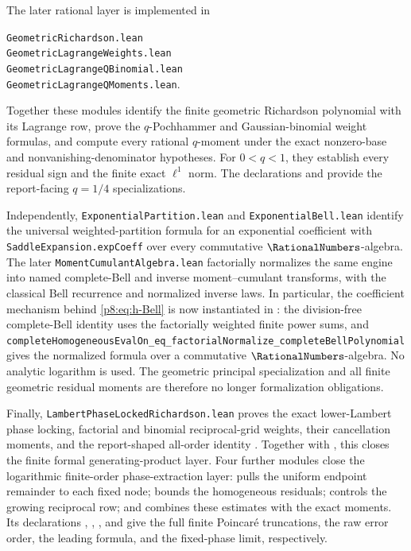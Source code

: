 \documentclass[11pt]{article}
\numberwithin{equation}{section}
\theoremstyle{definition}
\theoremstyle{remark}
\begin{document}
The later rational layer is implemented in
\begin{center}
\texttt{GeometricRichardson.lean}\\
\texttt{GeometricLagrangeWeights.lean}\\
\texttt{GeometricLagrangeQBinomial.lean}\\
\texttt{GeometricLagrangeQMoments.lean}.
\end{center}
Together these modules identify the finite geometric Richardson polynomial
with its Lagrange row, prove the \(q\)-Pochhammer and Gaussian-binomial weight
formulas, and compute every rational \(q\)-moment
under the exact nonzero-base and nonvanishing-denominator hypotheses.  For
\(0<q<1\), they establish every residual sign and the finite exact
\(\ell^1\) norm.  The declarations
 and
 provide
the report-facing \(q=1/4\) specializations.

Independently,
\texttt{ExponentialPartition.lean} and
\texttt{ExponentialBell.lean} identify the universal weighted-partition
formula for an exponential coefficient with
\texttt{SaddleExpansion.expCoeff} over every commutative
\(\RationalNumbers\)-algebra.  The later \texttt{MomentCumulantAlgebra.lean}
factorially normalizes the same engine into named complete-Bell and inverse
moment--cumulant transforms, with the classical Bell recurrence and
normalized inverse laws.  In particular, the coefficient mechanism behind
\eqref{p8:eq:h-Bell} is now instantiated in
: the division-free complete-Bell identity
uses the factorially weighted finite power sums, and
\nolinkurl{completeHomogeneousEvalOn_eq_factorialNormalize_completeBellPolynomial}
gives the normalized formula over a commutative $\RationalNumbers$-algebra.  No
analytic logarithm is used.  The geometric principal
specialization and all finite geometric residual moments are therefore no
longer formalization obligations.

Finally, \texttt{LambertPhaseLockedRichardson.lean} proves the exact
lower-Lambert phase locking, factorial and binomial reciprocal-grid weights,
their cancellation moments, and the report-shaped all-order identity
.
Together with , this closes the
finite formal generating-product layer.  Four further modules close the
logarithmic finite-order phase-extraction layer:
 pulls the uniform endpoint
remainder to each fixed node;
 bounds the homogeneous residuals;
 controls the growing reciprocal row;
and  combines these estimates with the
exact moments.  Its declarations
,
,
, and
 give the full
finite Poincar\'e truncations, the raw error order, the leading formula, and
the fixed-phase limit, respectively.
\end{document}
